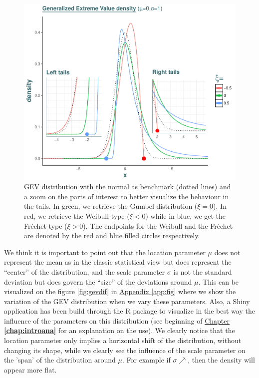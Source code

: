 \begin{figure}[!htb]
	\centering\includegraphics[width=0.8\linewidth]{gev3.pdf}\caption{GEV distribution with the normal as benchmark (dotted lines) and a zoom on the parts of interest to better visualize the behaviour in the tails. In green, we retrieve the Gumbel distribution ($\xi=0$). In red, we retrieve the Weibull-type ($\xi<0$) while in blue, we get the Fréchet-type ($\xi>0$). The endpoints for the Weibull and the Fréchet are denoted by the red and blue filled circles respectively. }\label{gevdens}
\end{figure}

 We think it is important to point out that the location parameter $\mu$ does not represent
the mean as in the classic statistical view but does represent the “center” of the distribution, and the scale parameter
$\sigma$ is not the standard deviation but does govern the “size” of the deviations around $\mu$. This can be visualized on the figure \ref{fig:gevdif} in \hyperref[app:fig]{Appendix \ref{app:fig}} where we show the variation of the GEV distribution when we vary these parameters. Also, a Shiny application has been build through the R package to visualize in the best way the influence of the parameters on this distribution (see beginning of \hyperref[chap:introana]{Chapter \textbf{\ref{chap:introana}}} for an explanation on the use). We clearly notice that the location parameter only implies a horizontal shift of the distribution, without changing its shape, while we clearly see the influence of the scale parameter on the 'span' of the distribution around $\mu$. For example if $\sigma \nearrow$, then the density will appear more flat.  

